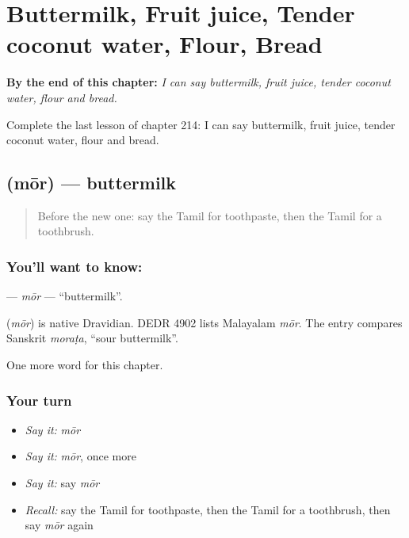 
\chapter{Buttermilk, Fruit juice, Tender coconut water, Flour, Bread}
\label{ch:ta-buttermilk-fruit-juice-tender-coconut-water-flour-bread}

\begin{chapteropening}
\textbf{By the end of this chapter:} \emph{I can say buttermilk, fruit juice, tender coconut water, flour and bread.}

Complete the last lesson of chapter 214: I can say buttermilk, fruit juice, tender coconut water, flour and bread.
\end{chapteropening}

\section[\texorpdfstring{\ta{மோர்} (mōr)}{மோர் (mōr)}]{ (mōr) — buttermilk}

\label{lesson:TA-C214-mor}



\begin{quote}
Before the new one: say the Tamil for toothpaste, then the Tamil for a toothbrush.
\end{quote}

\subsection*{You'll want to know: }
\textbf{} — \emph{mōr} — \textquotedblleft{}buttermilk\textquotedblright{}.

\begin{cousinweb}
\textbf{} (\emph{mōr}) is native Dravidian. DEDR 4902 lists Malayalam \emph{mōr}. The entry compares Sanskrit \emph{moraṭa}, \textquotedblleft{}sour buttermilk\textquotedblright{}.
\end{cousinweb}

\begin{grammarlens}[title={What you've built}]
One more word for this chapter.
\end{grammarlens}

\subsection*{Your turn}
\begin{itemize}
\raggedright
  \item \emph{Say it:} \emph{mōr}
  \item \emph{Say it:} \emph{mōr}, once more
  \item \emph{Say it:} say \emph{mōr}
  \item \emph{Recall:} say the Tamil for toothpaste, then the Tamil for a toothbrush, then say \emph{mōr} again
\end{itemize}

